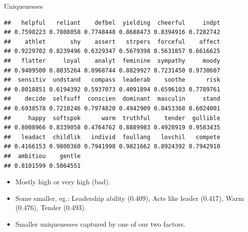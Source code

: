 \documentclass[ignorenonframetext,]{beamer}
\newenvironment{Shaded}{\begin{snugshade}}{\end{snugshade}}
\newcommand{\FloatTok}[1]{\textcolor[rgb]{0.00,0.00,0.81}{#1}}
\newcommand{\NormalTok}[1]{#1}
\newcommand{\OperatorTok}[1]{\textcolor[rgb]{0.81,0.36,0.00}{\textbf{#1}}}
\begin{document}
\begin{frame}[fragile]{Uniquenesses}
\protect\hypertarget{uniquenesses-1}{}

\begin{Shaded}
\end{Shaded}

\begin{verbatim}
##   helpful   reliant    defbel  yielding  cheerful     indpt 
## 0.7598223 0.7808058 0.7748448 0.8688473 0.8394916 0.7282742 
##    athlet       shy    assert   strpers  forceful    affect 
## 0.9229702 0.8239496 0.6329347 0.5679398 0.5631857 0.6616625 
##   flatter     loyal    analyt  feminine  sympathy     moody 
## 0.9409500 0.8035264 0.8968744 0.8829927 0.7231450 0.9730607 
##  sensitiv  undstand   compass  leaderab    soothe      risk 
## 0.8018851 0.6194392 0.5937073 0.4091894 0.6596103 0.7789761 
##    decide  selfsuff  conscien  dominant  masculin     stand 
## 0.6938578 0.7210246 0.7974820 0.4942909 0.8453368 0.6024001 
##     happy  softspok      warm  truthful    tender  gullible 
## 0.8008966 0.8339058 0.4764762 0.8889983 0.4928919 0.9583435 
##   leadact  childlik   individ  foullang   lovchil   compete 
## 0.4166153 0.9800360 0.7941998 0.9821662 0.8924392 0.7942910 
##  ambitiou    gentle 
## 0.8101599 0.5064551
\end{verbatim}

\begin{itemize}
\item
  Mostly high or very high (bad).
\item
  Some smaller, eg.: Leadership ability (0.409), Acts like leader
  (0.417), Warm (0.476), Tender (0.493).
\item
  Smaller uniquenesses captured by one of our two factors.
\end{itemize}

\end{frame}
\end{document}
